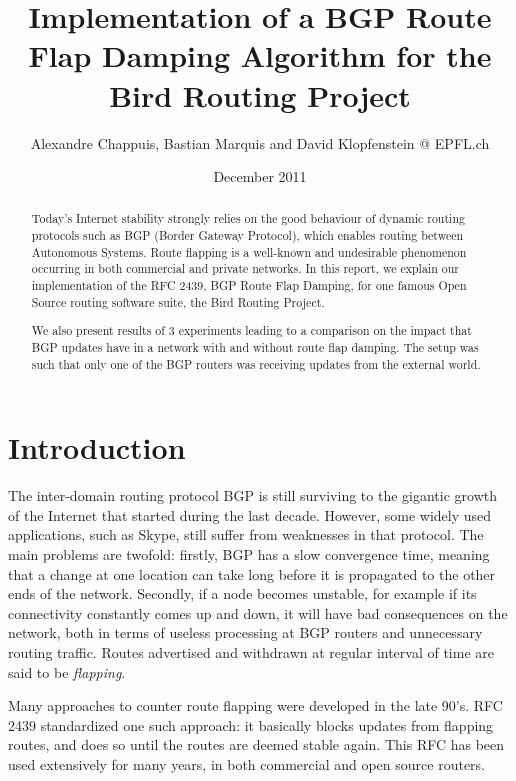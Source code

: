 \documentclass[a4paper,english]{IEEEtran}
\begin{document}
\date{December 2011}

\author{Alexandre Chappuis, Bastian Marquis and David Klopfenstein @ EPFL.ch}

\title{Implementation of a BGP Route Flap Damping Algorithm for the Bird
Routing Project}

\maketitle

\begin{abstract}
Today's Internet stability strongly relies on the good behaviour of
dynamic routing protocols such as BGP (Border Gateway Protocol), which
enables routing between Autonomous Systems. Route flapping is a well-known
and undesirable phenomenon occurring in both commercial and private
networks. In this report, we explain our implementation of the RFC
2439, BGP Route Flap Damping, for one famous Open Source routing software
suite, the Bird Routing Project.

We also present results of 3 experiments leading to a comparison on the impact that
BGP updates have in a network with and without route flap damping. The setup was
such that only one of the BGP routers was receiving updates from the external world.
\end{abstract}

\section{Introduction}

The inter-domain routing protocol BGP is still surviving to the gigantic
growth of the Internet that started during the last decade. However,
some widely used applications, such as Skype, still suffer from weaknesses
in that protocol. The main problems are twofold: firstly, BGP has
a slow convergence time, meaning that a change at one location can take
long before it is propagated to the other ends of the network.
Secondly, if a node becomes unstable, for example if its connectivity
constantly comes up and down, it will have bad consequences on the
network, both in terms of useless processing at BGP routers and unnecessary
routing traffic. Routes advertised and withdrawn at regular interval
of time are said to be \textit{flapping}.

Many approaches to counter route flapping were developed in
the late 90's. RFC 2439\cite{rfc2439} standardized one such approach:
it basically blocks updates from flapping routes, and does so until
the routes are deemed stable again. This RFC has been used extensively
for many years, in both commercial and open source routers.
\end{document}
